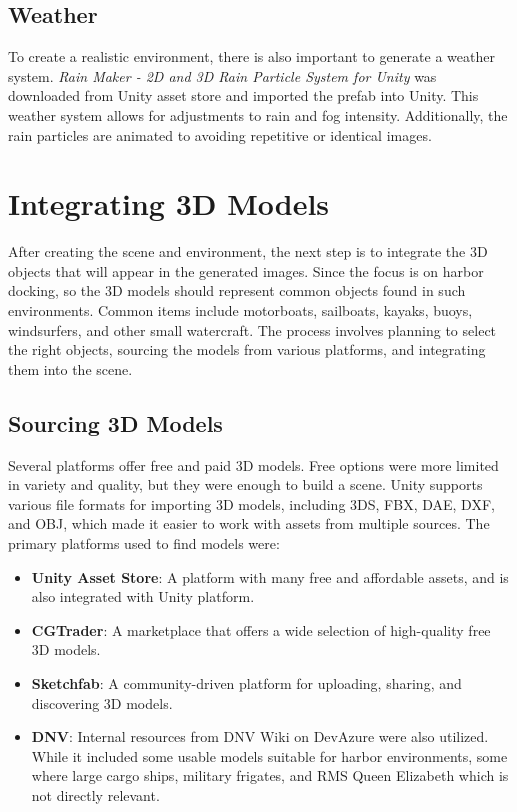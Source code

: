 \subsection{Weather}
To create a realistic environment, there is also important to generate a weather system. \textit{Rain Maker - 2D and 3D Rain Particle System for Unity} was downloaded from Unity asset store and imported the prefab into Unity. This weather system allows for adjustments to rain and fog intensity. Additionally, the rain particles are animated to avoiding repetitive or identical images.

\section{Integrating 3D Models}
After creating the scene and environment, the next step is to integrate the 3D objects that will appear in the generated images. Since the focus is on harbor docking, so the 3D models should represent common objects found in such environments. Common items include motorboats, sailboats, kayaks, buoys, windsurfers, and other small watercraft. The process involves planning to select the right objects, sourcing the models from various platforms, and integrating them into the scene.

\subsection{Sourcing 3D Models}
Several platforms offer free and paid 3D models. Free options were more limited in variety and quality, but they were enough to build a scene. Unity supports various file formats for importing 3D models, including 3DS, FBX, DAE, DXF, and OBJ, which made it easier to work with assets from multiple sources. The primary platforms used to find models were:
\begin{itemize}
\item \textbf{Unity Asset Store}: A platform with many free and affordable assets, and is also integrated with Unity platform. \cite{UnityAssetStore}
\item \textbf{CGTrader}: A marketplace that offers a wide selection of high-quality free 3D models.\cite{cgtrader}
\item \textbf{Sketchfab}: A community-driven platform for uploading, sharing, and discovering 3D models. \cite{sketchfab}
\item \textbf{DNV}: Internal resources from DNV Wiki on DevAzure were also utilized. While it included some usable models suitable for harbor environments, some where large cargo ships, military frigates, and RMS Queen Elizabeth which is not directly relevant.\cite{dnv_wiki}

\end{itemize}

